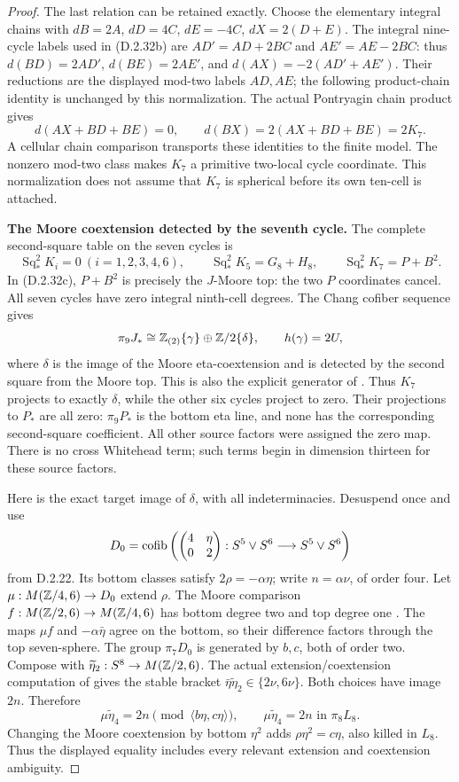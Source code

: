 \begin{proof}
The last relation can be retained exactly. Choose the
elementary integral chains with
$dB=2A$, $dD=4C$, $dE=-4C$, $dX=2(D+E)$.
The integral nine-cycle labels used in (D.2.32b) are
$AD'=AD+2BC$ and $AE'=AE-2BC$: thus
$d(BD)=2AD'$, $d(BE)=2AE'$, and
$d(AX)=-2(AD'+AE')$. Their reductions are the displayed
mod-two labels $AD,AE$; the following product-chain
identity is unchanged by this normalization.
The actual Pontryagin chain product gives
\[
 d(AX+BD+BE)=0,\qquad d(BX)=2(AX+BD+BE)=2K_7.
 \tag{D.2.32h}
\]
A cellular chain comparison transports these identities
to the finite model. The nonzero mod-two class makes
$K_7$ a primitive two-local cycle coordinate. This
normalization does not assume that $K_7$ is spherical
before its own ten-cell is attached.

\medskip\noindent
\textbf{The Moore coextension detected by the seventh cycle.}
The complete second-square table on the seven cycles is
\[
 \operatorname{Sq}_*^2K_i=0\ (i=1,2,3,4,6),\qquad
 \operatorname{Sq}_*^2K_5=G_8+H_8,\qquad
 \operatorname{Sq}_*^2K_7=P+B^2.
 \tag{D.2.32i}
\]
In (D.2.32c), $P+B^2$ is precisely the $J$-Moore top:
the two $P$ coordinates cancel. All seven cycles have
zero integral ninth-cell degrees.
The Chang cofiber sequence gives
\[
 \pi_9J_*\cong\mathbb Z_{(2)}\{\gamma\}\oplus\mathbb Z/2\{\delta\},
 \qquad h(\gamma)=2U,
\]
where $\delta$ is the image of the Moore eta-coextension
and is detected by the second square from the Moore top.
This is also the explicit generator of
\cite[Proposition~4.1 and Table~3]{I_Li2024}.
Thus $K_7$ projects to exactly $\delta$, while the other
six cycles project to zero. Their projections to $P_*$
are all zero: $\pi_9P_*$ is the bottom eta line, and
none has the corresponding second-square coefficient.
All other source factors were assigned the zero map.
There is no cross Whitehead term; such terms begin in
dimension thirteen for these source factors.

Here is the exact target image of $\delta$, with all
indeterminacies. Desuspend once and use
\[
 D_0=\operatorname{cofib}\left(
 \begin{pmatrix}4&\eta\\0&2\end{pmatrix}:
 S^5\vee S^6\longrightarrow S^5\vee S^6\right)
\]
from D.2.22. Its bottom classes satisfy
$2\rho=-\alpha\eta$; write $n=\alpha\nu$, of order four.
Let $\mu:M(\mathbb Z/4,6)\to D_0$ extend $\rho$.
The Moore comparison $f:M(\mathbb Z/2,6)\to M(\mathbb Z/4,6)$ has
bottom degree two and top degree one
\cite[(3.1)--(3.2)]{I_Li2024}.
The maps $\mu f$ and $-\alpha\bar\eta$ agree on the bottom,
so their difference factors through the top seven-sphere.
The group $\pi_7D_0$ is generated by $b,c$, both of order two.
Compose with $\widetilde\eta_2:S^8\to M(\mathbb Z/2,6)$.
The actual extension/coextension computation of
\cite[\S2, p.~191]{I_Gray2014} gives the stable bracket
$\bar\eta\widetilde\eta_2\in\{2\nu,6\nu\}$.
Both choices have image $2n$. Therefore
\[
 \mu\widetilde\eta_4=2n
       \pmod{\langle b\eta,c\eta\rangle},
 \qquad \mu\widetilde\eta_4=2n\text{ in }\pi_8L_8.
 \tag{D.2.32j}
\]
Changing the Moore coextension by bottom $\eta^2$ adds
$\rho\eta^2=c\eta$, also killed in $L_8$.
Thus the displayed equality includes every relevant
extension and coextension ambiguity.


\end{proof}
